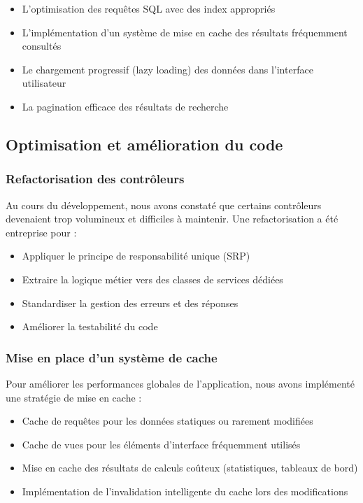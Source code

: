 \begin{itemize}
    \item L'optimisation des requêtes SQL avec des index appropriés
    \item L'implémentation d'un système de mise en cache des résultats fréquemment consultés
    \item Le chargement progressif (lazy loading) des données dans l'interface utilisateur
    \item La pagination efficace des résultats de recherche
\end{itemize}

\subsection{Optimisation et amélioration du code}

\subsubsection{Refactorisation des contrôleurs}
Au cours du développement, nous avons constaté que certains contrôleurs devenaient trop volumineux et difficiles à maintenir. Une refactorisation a été entreprise pour :

\begin{itemize}
    \item Appliquer le principe de responsabilité unique (SRP)
    \item Extraire la logique métier vers des classes de services dédiées
    \item Standardiser la gestion des erreurs et des réponses
    \item Améliorer la testabilité du code
\end{itemize}

\subsubsection{Mise en place d'un système de cache}
Pour améliorer les performances globales de l'application, nous avons implémenté une stratégie de mise en cache :

\begin{itemize}
    \item Cache de requêtes pour les données statiques ou rarement modifiées
    \item Cache de vues pour les éléments d'interface fréquemment utilisés
    \item Mise en cache des résultats de calculs coûteux (statistiques, tableaux de bord)
    \item Implémentation de l'invalidation intelligente du cache lors des modifications
\end{itemize}

